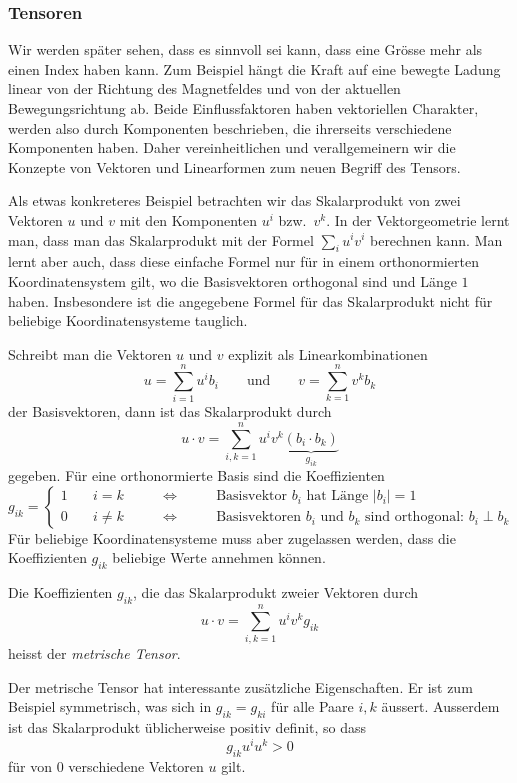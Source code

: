 %
%
\subsubsection{Tensoren}
Wir werden später sehen, dass es sinnvoll sei kann, dass eine Grösse
mehr als einen Index haben kann.
Zum Beispiel hängt die Kraft auf eine bewegte Ladung linear von der
Richtung des Magnetfeldes und von der aktuellen Bewegungsrichtung ab.
Beide Einflussfaktoren haben vektoriellen Charakter, werden also durch
Komponenten beschrieben, die ihrerseits verschiedene Komponenten haben.
Daher vereinheitlichen und verallgemeinern wir die Konzepte von Vektoren
und Linearformen zum neuen Begriff des Tensors.

Als etwas konkreteres Beispiel betrachten wir das Skalarprodukt von
zwei Vektoren $u$ und $v$ mit den Komponenten $u^i$ bzw.~$v^k$.
In der Vektorgeometrie lernt man, dass man das Skalarprodukt mit der
Formel $\sum_i u^iv^i$ berechnen kann.
Man lernt aber auch, dass diese einfache Formel nur für in einem
orthonormierten Koordinatensystem gilt, wo die Basisvektoren
orthogonal sind und Länge $1$ haben.
Insbesondere ist die angegebene Formel für das Skalarprodukt nicht
für beliebige Koordinatensysteme tauglich.

Schreibt man die Vektoren $u$ und $v$ explizit als Linearkombinationen
\[
u = \sum_{i=1}^n u^i b_i
\qquad\text{und}\qquad
v = \sum_{k=1}^n v^k b_k
\]
der Basisvektoren, dann ist das Skalarprodukt durch
\[
u\cdot v
=
\sum_{i,k=1}^n u^iv^k \underbrace{(b_i\cdot b_k)}_{\displaystyle g_{ik}}
\]
gegeben.
Für eine orthonormierte Basis sind die Koeffizienten
\[
g_{ik}
=
\left\{
\begin{array}{llcl}
1&\quad i=k&\qquad\Leftrightarrow\qquad&\text{Basisvektor $b_i$ hat Länge $|b_i|=1$}\\
0&\quad i\ne k&\qquad\Leftrightarrow\qquad&\text{Basisvektoren $b_i$ und $b_k$ sind orthogonal: $b_i\perp b_k$}
\end{array}
\right.
\]
Für beliebige Koordinatensysteme muss aber zugelassen werden, dass 
die Koeffizienten $g_{ik}$ beliebige Werte annehmen können.

\begin{definition}
Die Koeffizienten $g_{ik}$, die das Skalarprodukt zweier Vektoren durch
\[
u\cdot v
=
\sum_{i,k=1}^n u^iv^k g_{ik}
\]
heisst der {\em metrische Tensor}.
%
\end{definition}

Der metrische Tensor hat interessante zusätzliche Eigenschaften.
Er ist zum Beispiel symmetrisch, was sich in $g_{ik}=g_{ki}$ für
alle Paare $i,k$ äussert.
Ausserdem ist das Skalarprodukt üblicherweise positiv definit,
so dass 
\[
g_{ik}u^i u^k
>
0
\]
für von $0$ verschiedene Vektoren $u$ gilt.

